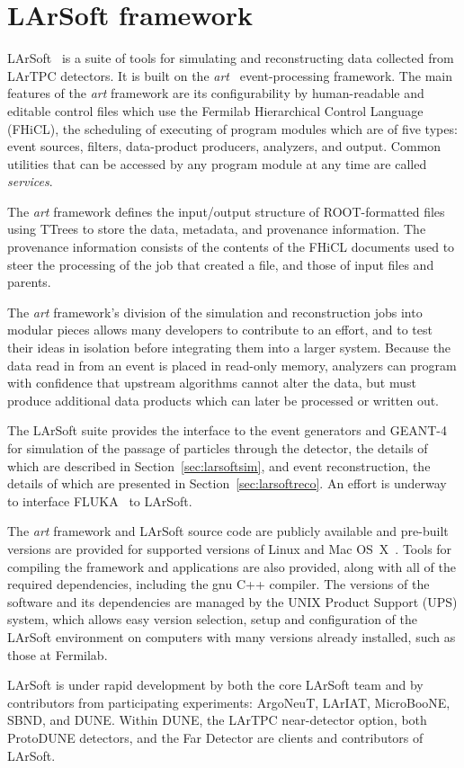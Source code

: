 \section{LArSoft framework}

LArSoft~\cite{larsoft} is a suite of tools for simulating and
reconstructing data collected from LArTPC detectors.  It is
built on the \textit{art}~\cite{art} event-processing framework.  The
main features of the \textit{art} framework are its configurability by
human-readable and editable control files which use the Fermilab
Hierarchical Control Language (FHiCL), the scheduling of executing of
program modules which are of five types: event sources, filters,
data-product producers, analyzers, and output.  Common utilities that
can be accessed by any program module at any time are called \textit{services}.

The \textit{art} framework defines the input/output structure of
ROOT-formatted files using TTrees to store the data, metadata, and
provenance information.  The provenance information consists of the
contents of the FHiCL documents used to steer the processing of the
job that created a file, and those of input files and parents.  

The
\textit{ art} framework's division of the simulation and reconstruction
jobs into modular pieces allows many developers to contribute to an
effort, and to test their ideas in isolation before integrating them
into a larger system.  Because the data read in from an event is
placed in read-only memory, analyzers can program with confidence that
upstream algorithms cannot alter the data, but must produce additional
data products which can later be processed or written out.

The LArSoft suite provides the interface to the event generators and
GEANT-4~\cite{geant4} for simulation of the passage of particles
through the detector, the details of which are described in
Section~\ref{sec:larsoftsim}, and event reconstruction, the details of
which are presented in Section~\ref{sec:larsoftreco}.  An effort is
underway to interface FLUKA~\cite{fluka} to LArSoft.  

The \textit{art}
framework and LArSoft source code are publicly available and pre-built
versions are provided for supported versions of Linux and Mac
OS~X~\cite{scisoft}.  Tools for compiling the framework and
applications are also provided, along with all of the required
dependencies, including the gnu C++ compiler.  The versions of the
software and its dependencies are managed by the UNIX Product Support (UPS) system,
which allows easy version selection, setup and configuration of the LArSoft
environment on computers with many versions already installed, such as
those at Fermilab.  

LArSoft is under rapid development by both the
core LArSoft team and by contributors from participating experiments:
ArgoNeuT, LArIAT, MicroBooNE, SBND, and DUNE.  Within DUNE, the LArTPC
near-detector option, both ProtoDUNE detectors, and the Far Detector
are clients and contributors of LArSoft.